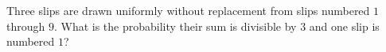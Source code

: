 Three slips are drawn uniformly without replacement from slips numbered $1$ through $9$. What is the probability their sum is divisible by $3$ and one slip is numbered $1$?

